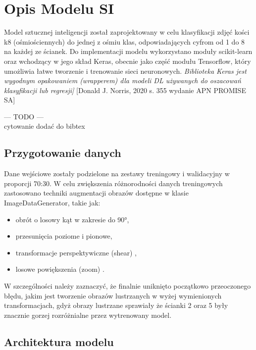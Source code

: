 \section{Opis Modelu SI}\label{sec:opis-modelu-si}

Model sztucznej inteligencji został zaprojektowany w celu klasyfikacji zdjęć kości k8 (ośmiościennych) do jednej z ośmiu klas, odpowiadających cyfrom od 1 do 8 na każdej ze ścianek.
Do implementacji modelu wykorzystano moduły scikit-learn oraz wchodzący w jego skład Keras, obecnie jako część modułu Tensorflow, który umożliwia łatwe tworzenie i trenowanie sieci neuronowych.
\textit{Biblioteka Keras jest wygodnym opakowaniem (wrapperem) dla modeli DL używanych do oszacowań klasyfikacji lub regresji]} [Donald J. Norris, 2020 s. 355 wydanie APN PROMISE SA]

--- TODO --- \\
cytowanie dodać do bibtex

\subsection{Przygotowanie danych}\label{subsec:przygotowanie-danych}

Dane wejściowe zostały podzielone na zestawy treningowy i walidacyjny w proporcji 70:30.
W celu zwiększenia różnorodności danych treningowych zastosowano techniki augmentacji obrazów dostępne w klasie ImageDataGenerator, takie jak:

\begin{itemize}
    \item obrót o losowy kąt w zakresie do 90°,
    \item przesunięcia poziome i pionowe,
    \item transformacje perspektywiczne (shear) ,
    \item losowe powiększenia (zoom) .
\end{itemize}

W szczególności należy zaznaczyć, że finalnie uniknięto początkowo przeoczonego błędu,
jakim jest tworzenie obrazów lustrzanych w wyżej wymienionych transformacjach, gdyż obrazy lustrzane
sprawiały że ścianki 2 oraz 5 były znacznie gorzej rozróżnialne przez wytrenowany model.


\subsection{Architektura modelu}\label{subsec:architektura-modelu}

